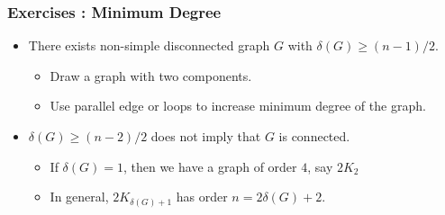 \documentclass{beamer}
\begin{document}
\begin{frame}
\frametitle{Exercises : Minimum Degree}
\begin{itemize}
	\item There exists non-simple disconnected graph $G$ with $\delta(G) \ge (n-1)/2$.
	\begin{itemize}
		\item Draw a graph with two components.
		\item Use parallel edge or loops to increase minimum degree of the graph.
	\end{itemize}
	\item $\delta(G) \ge (n-2)/2$ does not imply that $G$ is connected.
	\begin{itemize}
		\item If $\delta(G) = 1$, then we have a graph of order $4$, say $2K_2$
		\item In general, $2K_{\delta(G)+1}$ has order $n = 2\delta(G) + 2$.
	\end{itemize}
\end{itemize}
\end{frame}
\end{document}
